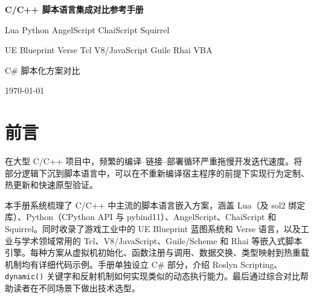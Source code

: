 \documentclass[12pt,a4paper,fontset=fandol]{ctexbook}
\newcommand{\Fn}[1]{\texttt{#1()}}
\begin{document}

\begin{titlepage}
\centering
\vspace*{3cm}
{\Huge\bfseries\color{algheadbg} C/C++ 脚本语言集成对比参考手册\par}
\vspace{1cm}
{\LARGE\color{blue!70!black} Lua \textbullet{} Python \textbullet{} AngelScript \textbullet{} ChaiScript \textbullet{} Squirrel\par}
\vspace{0.3cm}
{\LARGE\color{blue!70!black} UE Blueprint \textbullet{} Verse \textbullet{} Tcl \textbullet{} V8/JavaScript \textbullet{} Guile \textbullet{} Rhai \textbullet{} VBA\par}
\vspace{0.3cm}
{\LARGE\color{blue!70!black} C\# 脚本化方案对比\par}
\vfill
{\large\color{gray} \today\par}
\end{titlepage}

\frontmatter

\chapter*{前言}

在大型 C/C++ 项目中，频繁的编译--链接--部署循环严重拖慢开发迭代速度。将部分逻辑下沉到脚本语言中，可以在不重新编译宿主程序的前提下实现行为定制、热更新和快速原型验证。

本手册系统梳理了 C/C++ 中主流的脚本语言嵌入方案，涵盖 Lua（及 sol2 绑定库）、Python（CPython API 与 pybind11）、AngelScript、ChaiScript 和 Squirrel。同时收录了游戏工业中的 UE Blueprint 蓝图系统和 Verse 语言，以及工业与学术领域常用的 Tcl、V8/JavaScript、Guile/Scheme 和 Rhai 等嵌入式脚本引擎。每种方案从虚拟机初始化、函数注册与调用、数据交换、类型映射到热重载机制均有详细代码示例。手册单独设立 C\# 部分，介绍 Roslyn Scripting、\Fn{dynamic} 关键字和反射机制如何实现类似的动态执行能力。最后通过综合对比帮助读者在不同场景下做出技术选型。

\makeatletter
{}
\makeatother
\end{document}
